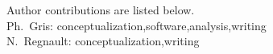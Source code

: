 Author contributions are listed below. \\
Ph.~Gris: conceptualization,software,analysis,writing \\
N.~Regnault: conceptualization,writing \\
